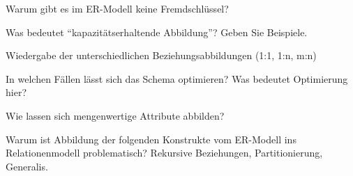 \begin{fragen}
	\begin{enumeration}
		\item Warum gibt es im ER-Modell keine Fremdschlüssel?
		\item Was bedeutet ``kapazitätserhaltende Abbildung''? Geben Sie Beispiele.
		\item Wiedergabe der unterschiedlichen Beziehungsabbildungen (1:1, 1:n, m:n)
		\item In welchen Fällen lässt sich das Schema optimieren? Was bedeutet Optimierung hier?
		\item Wie lassen sich mengenwertige Attribute abbilden?
		\item Warum ist Abbildung der folgenden Konstrukte vom ER-Modell ins Relationenmodell problematisch? Rekursive Beziehungen, Partitionierung, Generalis.
	\end{enumeration}
\end{fragen}